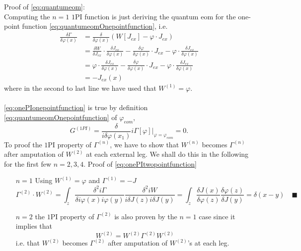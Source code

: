 Proof of \ref{eq:quantumeom}:\\
Computing the $n=1$ $1$PI function is just deriving the quantum eom for the one-point function \ref{eq:quantumeomOnepointfunction}, i.e.
\begin{align*}
	\frac{\delta \Gamma}{\delta \varphi(x)} &= \frac{\delta}{\delta \varphi(x)} (W[J_{ex}] - \varphi \cdot J_{ex}) \\
	&=\frac{\delta W}{\delta J_{ex}} \cdot \frac{\delta J_{ex}}{\delta \varphi(x)} - \frac{\delta \varphi}{\delta \varphi(x)} \cdot J_{ex} - \varphi \cdot \frac{\delta J_{ex}}{\delta \varphi(x)} \\
	&= \varphi \cdot \frac{\delta J_{ex}}{\delta \varphi(x)} - \frac{\delta \varphi}{\delta \varphi(x)} \cdot J_{ex} - \varphi \cdot \frac{\delta J_{ex}}{\delta \varphi(x)} \\
	&=-J_{ex}(x)
\end{align*}
where in the second to last line we have used that $W^{(1)} = \varphi$.
\\
\\
\ref{eq:onePIonepointfunction} is true by definition \ref{eq:quantumeomOnepointfunction} of $\varphi_{eom}$,
\begin{equation}
	G^{(1PI)} = \frac{\delta}{i \delta \varphi(x_1)} i \Gamma[\varphi] |_{\varphi=\varphi_{eom}} =0.
\end{equation}
To proof the $1$PI property of $\Gamma^{(n)}$, we have to show that $W^{(n)}$ becomes $\Gamma^{(n)}$ after amputation of $W^{(2)}$ at each external leg. We shall do this in the following for the first few $n=2,3,4$. Proof of \ref{eq:onePItwopointfunction}
\begin{enumerate}
\item[$n=1$]  Using $W^{(1)}=\varphi$ and $\Gamma^{(1)}=-J$
\begin{equation*}
	\Gamma^{(2)} \cdot W^{(2)} = \int_z \frac{\delta^2 i\Gamma}{\delta i\varphi(x) i\varphi(y)} \frac{\delta^2 i W}{i\delta J(z) i\delta J(y)} = \int_z \frac{\delta J(x)}{\delta \varphi(z)} \frac{\delta \varphi(z)}{\delta J(y)} = \delta(x-y) \quad \blacksquare
\end{equation*}
\item[$n=2$] the $1$PI property of $\Gamma^{(2)}$ is also proven by the $n=1$ case since it implies that
\begin{equation}
	W^{(2)} = W^{(2)} \Gamma^{(2)} W^{(2)}
\end{equation}
i.e. that $W^{(2)}$ becomes $\Gamma^{(2)}$ after amputation of $W^{(2)}$'s at each leg.
\end{enumerate}
